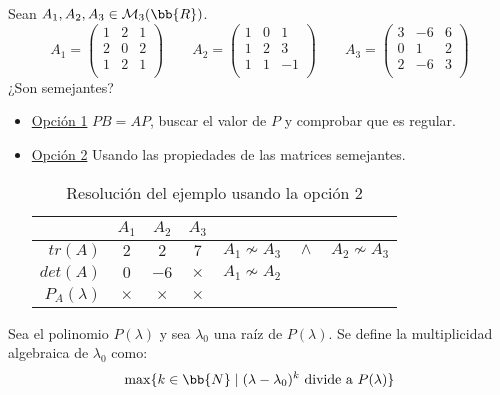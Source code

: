 \begin{ejemplo}
    Sean $A_1, A_2, A_3 \in \mathcal{M}_3(\bb{R})$.
    \begin{equation*}
        A_1 = \left( \begin{array}{ccc}
            1 & 2 & 1 \\
            2 & 0 & 2 \\
            1 & 2 & 1 \\
        \end{array}\right) \qquad
        A_2 = \left( \begin{array}{ccc}
            1 & 0 & 1 \\
            1 & 2 & 3 \\
            1 & 1 & -1 \\
        \end{array}\right) \qquad
        A_3 = \left( \begin{array}{ccc}
            3 & -6 & 6 \\
            0 & 1 & 2 \\
            2 & -6 & 3 \\
        \end{array}\right)
    \end{equation*}
    ¿Son semejantes?
    \begin{itemize}
        \item \underline{Opción 1} $PB=AP$, buscar el valor de $P$ y comprobar que es regular.
        \item \underline{Opción 2} Usando las propiedades de las matrices semejantes.
        \begin{table}[H]
            \centering
            \begin{tabular}{r|ccc|l}
                 & $A_1$ & $A_2$ & $A_3$ & \\ \hline
                 $tr(A)$ & $2$ & $2$ & $7$ & $A_1 \nsim A_3 \quad \land \quad A_2 \nsim A_3$ \\
                 $det(A)$ & $0$ & $-6$ & $\times$ & $A_1 \nsim A_2$\\
                 $P_A(\lambda)$ & $\times$ & $\times$ & $\times$ &
            \end{tabular}
            \caption{Resolución del ejemplo usando la opción 2}
        \end{table}
    \end{itemize}
\end{ejemplo}


\begin{definicion} Sea el polinomio $P(\lambda)$ y sea $\lambda_0$ una raíz de $P(\lambda)$. Se define la multiplicidad algebraica de $\lambda_0$ como:
    \begin{equation*}
        \max\{k\in \bb{N} \mid (\lambda - \lambda_0)^k \text{ divide a } P(\lambda)\}
    \end{equation*}
    \end{definicion}
    
